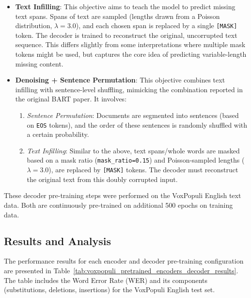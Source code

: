 \begin{itemize}
    \item \textbf{Text Infilling}: This objective aims to teach the model to predict missing text spans. Spans of text are sampled (lengths drawn from a Poisson distribution, $\lambda=3.0$), and each chosen span is replaced by a single \texttt{[MASK]} token. The decoder is trained to reconstruct the original, uncorrupted text sequence. This differs slightly from some interpretations where multiple mask tokens might be used, but captures the core idea of predicting variable-length missing content.
    \item \textbf{Denoising + Sentence Permutation}: This objective combines text infilling with sentence-level shuffling, mimicking the combination reported in the original BART paper. It involves:
        \begin{enumerate}
            \item \textit{Sentence Permutation}: Documents are segmented into sentences (based on \texttt{EOS} tokens), and the order of these sentences is randomly shuffled with a certain probability.
            \item \textit{Text Infilling}: Similar to the above, text spans/whole words are masked based on a mask ratio (\texttt{mask\_ratio=0.15}) and Poisson-sampled lengths ($\lambda=3.0$), are replaced by \texttt{[MASK]} tokens. The decoder must reconstruct the original text from this doubly corrupted input.
        \end{enumerate}
\end{itemize}
These decoder pre-training steps were performed on the VoxPopuli English text data. Both are continuously pre-trained on additional 500 epochs on training data.

\subsection{Results and Analysis}
The performance results for each encoder and decoder pre-training configuration are presented in Table~\ref{tab:voxpopuli_pretrained_encoders_decoder_results}. The table includes the Word Error Rate (WER) and its components (substitutions, deletions, insertions) for the VoxPopuli English test set.


